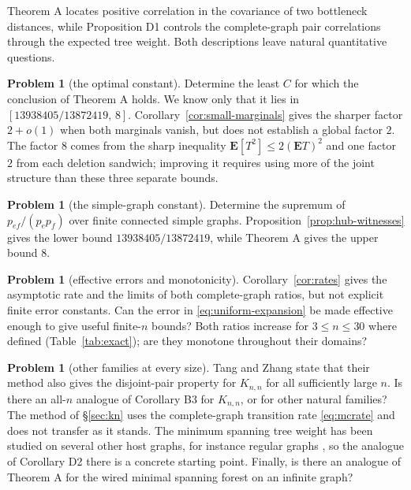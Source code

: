 \documentclass[11pt,a4paper]{amsart}
\theoremstyle{plain}
\theoremstyle{definition}
\newtheorem{problem}[theorem]{Problem}
\theoremstyle{remark}
\newcommand{\E}{\mathbf{E}}
\begin{document}
Theorem A locates positive correlation in the covariance of two bottleneck
distances, while Proposition D1 controls the complete-graph pair correlations
through the expected tree weight. Both descriptions leave natural quantitative
questions.

\begin{problem}[the optimal constant]
Determine the least $C$ for which the conclusion of Theorem A holds. We know only
that it lies in $[13938405/13872419,\,8]$. Corollary~\ref{cor:small-marginals} gives
the sharper factor $2+o(1)$ when both marginals vanish, but does not establish a
global factor $2$. The factor $8$ comes from the sharp inequality
$\E[T^2]\le2(\E T)^2$ and one factor $2$ from each deletion sandwich; improving
it requires using more of the joint structure than these three separate bounds.
\end{problem}

\begin{problem}[the simple-graph constant]
Determine the supremum of $p_{ef}/(p_ep_f)$ over finite connected simple graphs.
Proposition~\ref{prop:hub-witnesses} gives the lower bound
$13938405/13872419$, while Theorem A gives the upper bound $8$.
\end{problem}

\begin{problem}[effective errors and monotonicity]
Corollary~\ref{cor:rates} gives the asymptotic rate and the limits of both
complete-graph ratios, but not explicit finite error constants. Can the error in
\eqref{eq:uniform-expansion} be made effective enough to give useful finite-$n$
bounds? Both ratios increase for $3\le n\le30$ where defined
(Table~\ref{tab:exact}); are they monotone throughout their domains?
\end{problem}

\begin{problem}[other families at every size]
Tang and Zhang \cite[Remark 1.2]{TZ} state that their method also gives the
disjoint-pair property for $K_{n,n}$ for all sufficiently large $n$. Is there an
all-$n$ analogue of Corollary B3 for $K_{n,n}$, or for other natural families?
The method of \S\ref{sec:kn} uses the complete-graph transition rate
\eqref{eq:mcrate} and does not transfer as it stands. The minimum spanning tree
weight has been studied on several other host graphs, for instance regular graphs
\cite{BFM}, so the analogue of Corollary D2 there is a concrete starting point.
Finally, is there an analogue of Theorem A for the wired minimal spanning forest
on an infinite graph?
\end{problem}
\end{document}
